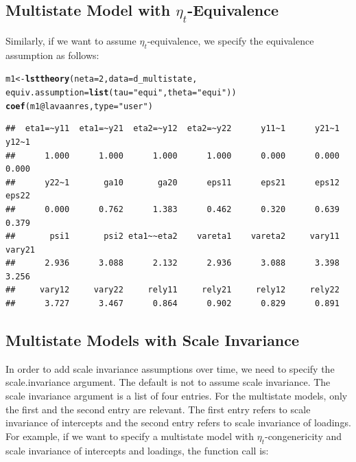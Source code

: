 \documentclass[10pt]{article}\usepackage[]{graphicx}\usepackage[]{xcolor}
\makeatletter
\newcommand{\hlnum}[1]{\textcolor[rgb]{0.686,0.059,0.569}{#1}}%
\newcommand{\hlstr}[1]{\textcolor[rgb]{0.192,0.494,0.8}{#1}}%
\newcommand{\hlopt}[1]{\textcolor[rgb]{0,0,0}{#1}}%
\newcommand{\hlstd}[1]{\textcolor[rgb]{0.345,0.345,0.345}{#1}}%
\newcommand{\hlkwb}[1]{\textcolor[rgb]{0.69,0.353,0.396}{#1}}%
\newcommand{\hlkwc}[1]{\textcolor[rgb]{0.333,0.667,0.333}{#1}}%
\newcommand{\hlkwd}[1]{\textcolor[rgb]{0.737,0.353,0.396}{\textbf{#1}}}%
\newenvironment{kframe}{%
 \def\at@end@of@kframe{}%
 \ifinner\ifhmode%
  \def\at@end@of@kframe{\end{minipage}}%
  \begin{minipage}{\columnwidth}%
 \fi\fi%
 \def\FrameCommand##1{\hskip\@totalleftmargin \hskip-\fboxsep
 \colorbox{shadecolor}{##1}\hskip-\fboxsep
     \hskip-\linewidth \hskip-\@totalleftmargin \hskip\columnwidth}%
 \MakeFramed {\advance\hsize-\width
   \@totalleftmargin\z@ \linewidth\hsize
   \@setminipage}}%
 {\par\unskip\endMakeFramed%
 \at@end@of@kframe}
\newenvironment{knitrout}{}{} %
\makeatother
\begin{document}
\subsection{Multistate Model with $\eta_t$-Equivalence}

Similarly, if we want to assume $\eta_t$-equivalence, we specify the equivalence assumption as follows:
%
\begin{knitrout}
\color{fgcolor}\begin{kframe}
\begin{alltt}
\hlstd{m1} \hlkwb{<-} \hlkwd{lsttheory}\hlstd{(}\hlkwc{neta}\hlstd{=}\hlnum{2}\hlstd{,} \hlkwc{data}\hlstd{=d_multistate,}
                \hlkwc{equiv.assumption}\hlstd{=}\hlkwd{list}\hlstd{(}\hlkwc{tau}\hlstd{=}\hlstr{"equi"}\hlstd{,} \hlkwc{theta}\hlstd{=}\hlstr{"equi"}\hlstd{))}
\hlkwd{coef}\hlstd{(m1}\hlopt{@}\hlkwc{lavaanres}\hlstd{,} \hlkwc{type}\hlstd{=}\hlstr{"user"}\hlstd{)}
\end{alltt}
\begin{verbatim}
##  eta1=~y11  eta1=~y21  eta2=~y12  eta2=~y22      y11~1      y21~1      y12~1 
##      1.000      1.000      1.000      1.000      0.000      0.000      0.000 
##      y22~1       ga10       ga20      eps11      eps21      eps12      eps22 
##      0.000      0.762      1.383      0.462      0.320      0.639      0.379 
##       psi1       psi2 eta1~~eta2    vareta1    vareta2     vary11     vary21 
##      2.936      3.088      2.132      2.936      3.088      3.398      3.256 
##     vary12     vary22     rely11     rely21     rely12     rely22 
##      3.727      3.467      0.864      0.902      0.829      0.891
\end{verbatim}
\end{kframe}
\end{knitrout}
%



\subsection{Multistate Models with Scale Invariance}

In order to add scale invariance assumptions over time, we need to specify the scale.invariance argument. The default is not to assume scale invariance. The scale invariance argument is a list of four entries. For the multistate models, only the first and the second entry are relevant. The first entry refers to scale invariance of intercepts and the second entry refers to scale invariance of loadings. For example, if we want to specify a multistate model with $\eta_t$-congenericity and scale invariance of intercepts and loadings, the function call is:
\end{document}
